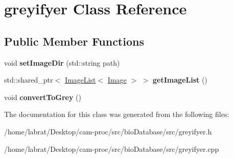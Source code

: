 \hypertarget{classgreyifyer}{}\section{greyifyer Class Reference}
\label{classgreyifyer}
\subsection*{Public Member Functions}
\begin{DoxyCompactItemize}
\item 
void {\bfseries set\+Image\+Dir} (std\+::string path)\hypertarget{classgreyifyer_a65bb66356ffbb4ab2d353b5b8570e4aa}{}\label{classgreyifyer_a65bb66356ffbb4ab2d353b5b8570e4aa}

\item 
std\+::shared\+\_\+ptr$<$ \hyperlink{classImageList}{Image\+List}$<$ \hyperlink{classImage}{Image} $>$ $>$ {\bfseries get\+Image\+List} ()\hypertarget{classgreyifyer_a2e649c47dee46bbfab3657775b1c802e}{}\label{classgreyifyer_a2e649c47dee46bbfab3657775b1c802e}

\item 
void {\bfseries convert\+To\+Grey} ()\hypertarget{classgreyifyer_a8e9e7e3087f18385676263068115916f}{}\label{classgreyifyer_a8e9e7e3087f18385676263068115916f}

\end{DoxyCompactItemize}


The documentation for this class was generated from the following files\+:\begin{DoxyCompactItemize}
\item 
/home/labrat/\+Desktop/cam-\/proc/src/bio\+Database/src/greyifyer.\+h\item 
/home/labrat/\+Desktop/cam-\/proc/src/bio\+Database/src/greyifyer.\+cpp\end{DoxyCompactItemize}
